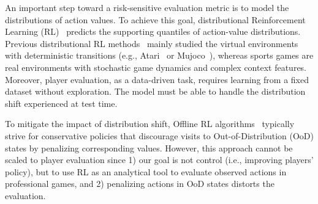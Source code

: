 \documentclass{article}
\begin{document}
An important step toward a risk-sensitive evaluation metric is to model the distributions of action values. To achieve this goal, distributional Reinforcement Learning (RL)~\cite{bdr2022} predicts the supporting quantiles of action-value distributions. Previous distributional RL methods~\cite{bellemare2017distributional,Dabney2018DistributionalRL,Mavrin2019DistributionalRL,Zhou2020NonCrossing,Zhou2021Quantile} mainly studied the virtual environments with deterministic transitions (e.g., Atari~\cite{bellemare2013arcade} or Mujoco~\cite{Todorov2012Mujoco}), whereas sports games are real environments with stochastic game dynamics and complex context features. Moreover, player evaluation, as a data-driven task, requires learning from a fixed dataset without exploration. The model must be able to handle the distribution shift experienced at test time.

To mitigate the impact of distribution shift, Offline RL algorithms~\cite{Levine2020OfflineRL} typically strive for conservative policies that discourage visits to Out-of-Distribution (OoD) states by penalizing corresponding values. However, this approach cannot be scaled to player evaluation since 1) our goal is not control (i.e., improving players' policy), but to use RL as an analytical tool to evaluate observed actions in professional games, and 2) penalizing actions in OoD states distorts the evaluation.
\end{document}
